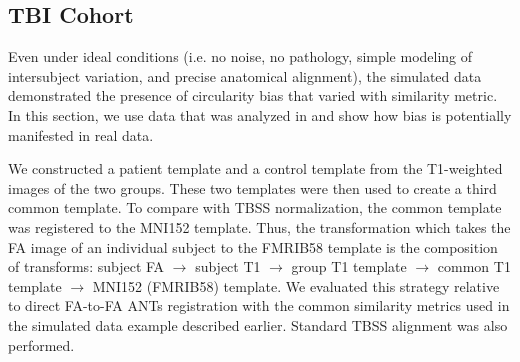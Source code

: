 \documentclass[final,5p,times,twocolumn]{elsarticle}
\begin{document}
\subsection{TBI Cohort} 




Even under ideal conditions (i.e. no noise, no pathology, simple modeling of 
intersubject variation, and precise anatomical alignment), the simulated
data demonstrated the presence of circularity bias that varied with similarity
metric.  In this section, we use data that was analyzed in \cite{Stone2011}
and show how bias is potentially manifested in real data. 

We constructed a patient template and a control template from the 
T1-weighted images of the two groups.  These two 
templates were then used to create a third common template.  
To compare with TBSS normalization, the common template was
registered to the MNI152 template.  Thus, the transformation
which takes the FA image of an individual subject to the FMRIB58
template is the composition of transforms: 
subject FA $\rightarrow$ subject T1 $\rightarrow$ group T1 template $\rightarrow$ 
common T1 template $\rightarrow$ MNI152 (FMRIB58) template.
We evaluated this strategy relative to direct FA-to-FA
ANTs registration with the common similarity metrics used in
the simulated data example described earlier.
Standard TBSS alignment was also performed.  
\end{document}
